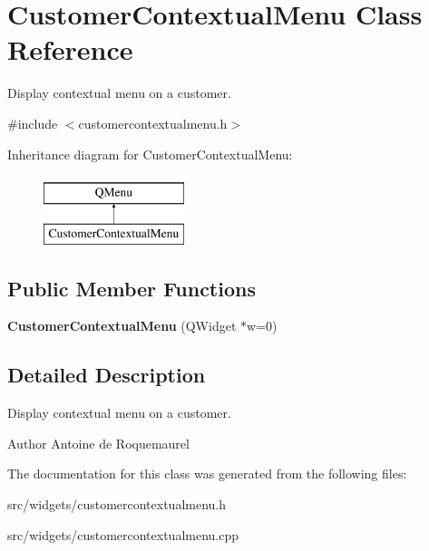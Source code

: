 \hypertarget{classCustomerContextualMenu}{\section{Customer\+Contextual\+Menu Class Reference}
\label{classCustomerContextualMenu}
}


Display contextual menu on a customer.  




{\ttfamily \#include $<$customercontextualmenu.\+h$>$}

Inheritance diagram for Customer\+Contextual\+Menu\+:\begin{figure}[H]
\begin{center}
\leavevmode
\includegraphics[height=2.000000cm]{d5/db9/classCustomerContextualMenu}
\end{center}
\end{figure}
\subsection*{Public Member Functions}
\begin{DoxyCompactItemize}
\item 
\hypertarget{classCustomerContextualMenu_a798a08f4b8526398a54752e7de87930e}{{\bfseries Customer\+Contextual\+Menu} (Q\+Widget $\ast$w=0)}\label{classCustomerContextualMenu_a798a08f4b8526398a54752e7de87930e}

\end{DoxyCompactItemize}


\subsection{Detailed Description}
Display contextual menu on a customer. 

\begin{DoxyAuthor}{Author}
Antoine de Roquemaurel 
\end{DoxyAuthor}


The documentation for this class was generated from the following files\+:\begin{DoxyCompactItemize}
\item 
src/widgets/customercontextualmenu.\+h\item 
src/widgets/customercontextualmenu.\+cpp\end{DoxyCompactItemize}
